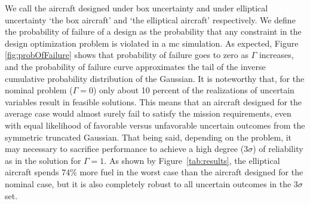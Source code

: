 We call the aircraft designed under box uncertainty and under elliptical uncertainty `the box aircraft'
and `the elliptical aircraft' respectively. We
define the probability of failure of a design as the probability that any constraint
in the design optimization problem is violated in a \gls{mc} simulation.
As expected, Figure \ref{fig:probOfFailure} shows that probability of failure goes to zero as $\Gamma$ increases,
and the probability of failure curve approximates the tail of the inverse cumulative probability
distribution of the Gaussian.
It is noteworthy that, for the nominal problem ($\Gamma = 0$) only about 10 percent of the realizations of
uncertain variables result in feasible solutions.
This means that an aircraft designed for the average case would almost surely
fail to satisfy the mission requirements, even with equal likelihood of favorable versus
unfavorable uncertain outcomes from the symmetric truncated Gaussian.
That being said, depending on the problem, it may necessary to sacrifice
performance to achieve a high degree ($3\sigma$) of
reliability as in the solution for $\Gamma = 1$. As shown by Figure~\ref{tab:results},
the elliptical aircraft spends 74\% more fuel
in the worst case than the aircraft designed for the nominal case, but it
is also completely robust to all uncertain outcomes in the $3\sigma$ set.

